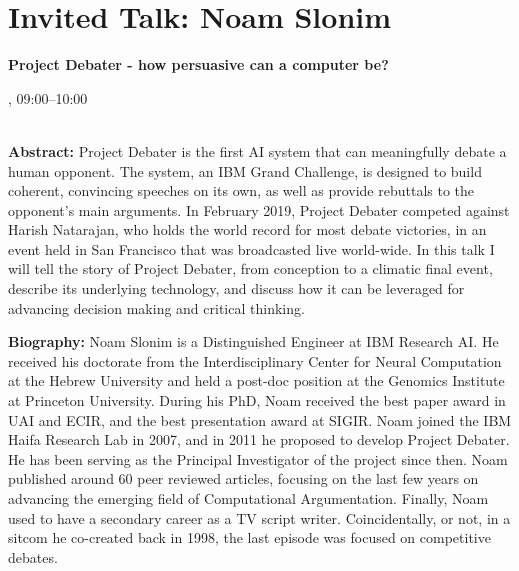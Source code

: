 \section{Invited Talk: Noam Slonim}

\begin{center}
\begin{Large}
    {\bfseries\Large Project Debater - how persuasive can a computer be?} 
\vspace{1em}\par
\end{Large}

\daydateyear, 09:00--10:00 \vspace{1em}\\
\PlenaryLoc \\
\vspace{1em}\par
\end{center}

\noindent
{\bfseries Abstract:} Project Debater is the first AI system that can meaningfully debate a human opponent. The system, an IBM Grand Challenge, is designed to build coherent, convincing speeches on its own, as well as provide rebuttals to the opponent’s main arguments. In February 2019, Project Debater competed against Harish Natarajan, who holds the world record for most debate victories, in an event held in San Francisco that was broadcasted live world-wide. In this talk I will tell the story of Project Debater, from conception to a climatic final event, describe its underlying technology, and discuss how it can be leveraged for advancing decision making and critical thinking.

\vspace{3em}\par 

\vfill
\noindent

{\bfseries Biography:} 
Noam Slonim is a Distinguished Engineer at IBM Research AI. He received his doctorate from the Interdisciplinary Center for Neural Computation at the Hebrew University and held a post-doc position at the Genomics Institute at Princeton University. During his PhD, Noam received the best paper award in UAI and ECIR, and the best presentation award at SIGIR. Noam joined the IBM Haifa Research Lab in 2007, and in 2011 he proposed to develop Project Debater. He has been serving as the Principal Investigator of the project since then. Noam published around 60 peer reviewed articles, focusing on the last few years on advancing the emerging field of Computational Argumentation. Finally, Noam used to have a secondary career as a TV script writer. Coincidentally, or not, in a sitcom he co-created back in 1998, the last episode was focused on competitive debates.

\newpage
